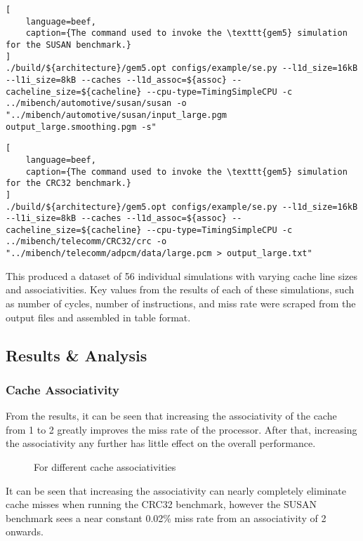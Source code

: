 \begin{lstlisting}[
    language=beef,
    caption={The command used to invoke the \texttt{gem5} simulation for the SUSAN benchmark.}
]
./build/${architecture}/gem5.opt configs/example/se.py --l1d_size=16kB --l1i_size=8kB --caches --l1d_assoc=${assoc} --cacheline_size=${cacheline} --cpu-type=TimingSimpleCPU -c ../mibench/automotive/susan/susan -o "../mibench/automotive/susan/input_large.pgm output_large.smoothing.pgm -s"
\end{lstlisting}

\begin{lstlisting}[
    language=beef,
    caption={The command used to invoke the \texttt{gem5} simulation for the CRC32 benchmark.}
]
./build/${architecture}/gem5.opt configs/example/se.py --l1d_size=16kB --l1i_size=8kB --caches --l1d_assoc=${assoc} --cacheline_size=${cacheline} --cpu-type=TimingSimpleCPU -c ../mibench/telecomm/CRC32/crc -o "../mibench/telecomm/adpcm/data/large.pcm > output_large.txt"
\end{lstlisting}

This produced a dataset of 56 individual simulations with varying cache line sizes and
associativities.
Key values from the results of each of these simulations, such as number of cycles,
number of instructions, and miss rate were scraped from the output files and assembled 
in table format.

\subsection{Results \& Analysis}

\subsubsection{Cache Associativity}

From the results, it can be seen that increasing the associativity of the cache from 
1 to 2 greatly improves the miss rate of the processor. After that, increasing the 
associativity any further has little effect on the overall performance.

\begin{figure}[H]
    \centering
    
    \caption{For different cache associativities}
    \label{fig:partb-assoc}
\end{figure}%

It can be seen that increasing the associativity can nearly completely eliminate
cache misses when running the CRC32 benchmark, however the SUSAN benchmark sees a near
constant 0.02\% miss rate from an associativity of 2 onwards.

